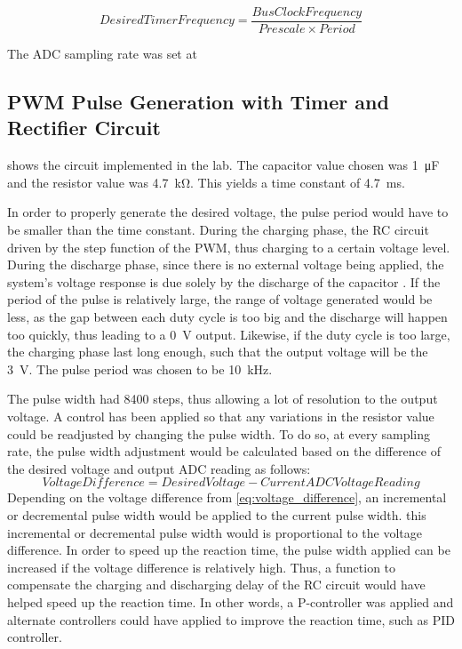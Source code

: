 \documentclass[a4paper,titlepage]{article}
\begin{document}
\begin{equation}
Desired Timer Frequency = \frac{Bus Clock Frequency}{Prescale \times Period }
\end{equation}


The ADC sampling rate was set at 

\subsection{PWM Pulse Generation with Timer and Rectifier Circuit}
 shows the circuit implemented in the lab. The capacitor value chosen was \SI{1}{\micro\farad} and the resistor value was \SI{4.7}{\kilo\ohm}. This yields a time constant of \SI{4.7}{\milli \second}.

In order to properly generate the desired voltage, the pulse period would have to be smaller than the time constant. During the charging phase, the RC circuit driven by the step function of the PWM, thus charging to a certain voltage level. During the discharge phase, since there is no external voltage being applied, the system's voltage response is due solely by the discharge of the capacitor \cite{pwm_rc_citation}. If the period of the pulse is relatively large, the range of voltage generated would be less, as the gap between each duty cycle is too big and the discharge will happen too quickly, thus leading to a \SI{0}{\volt} output. Likewise, if the duty cycle is too large, the charging phase last long enough, such that the output voltage will be the \SI{3}{\volt}. The pulse period was chosen to be \SI{10}{\kilo \hertz}.


The pulse width had 8400 steps, thus allowing a lot of resolution to the output voltage. A control has been applied so that any variations in the resistor value could be readjusted by changing the pulse width. To do so, at every sampling rate, the pulse width adjustment would be calculated based on the difference of the desired voltage and output ADC reading as follows:
\begin{equation}
Voltage Difference = Desired Voltage - Current ADC Voltage Reading
\label{eq:voltage_difference}
\end{equation}
Depending on the voltage difference from \eqref{eq:voltage_difference}, an incremental or decremental pulse width would be applied to the current pulse width. this incremental or decremental pulse width would is proportional to the voltage difference. In order to speed up the reaction time, the pulse width applied can be increased if the voltage difference is relatively high. Thus, a function to compensate the charging and discharging delay of the RC circuit would have helped speed up the reaction time. In other words, a P-controller was applied and alternate controllers could have applied to improve the reaction time, such as PID controller.
\end{document}
